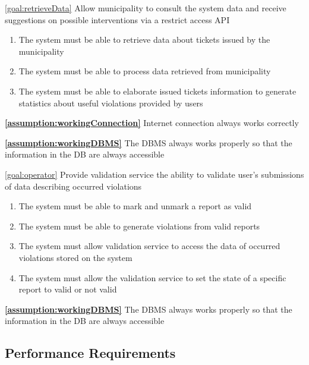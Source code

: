 \begin{description}
   		\item \ref{goal:retrieveData} Allow municipality to consult the system data and receive suggestions on possible interventions via a restrict access API 
   				\begin{enumerate}[resume*] 
  				\item The system must be able to retrieve data about tickets issued by the municipality 
   				\item The system must be able to process data retrieved from municipality
   				\item The system must be able to elaborate issued tickets information to generate statistics about useful violations provided by users
   			\end{enumerate}
   			
   			\textbf{\ref{assumption:workingConnection}} Internet connection always works correctly
   			
			\textbf{\ref{assumption:workingDBMS}} The DBMS always works properly so that the information in the DB are always accessible

		\item \ref{goal:operator} Provide validation service the ability to validate user's submissions of data describing occurred violations
			   \begin{enumerate}[resume*]
				   \item The system must be able to mark and unmark a report as valid
				   \item The system must be able to generate violations from valid reports
				   \item The system must allow validation service to access the data of occurred violations stored on the system
				   \item The system must allow the validation service to set the state of a speciﬁc report to valid or not valid
			   \end{enumerate}

			   \textbf{\ref{assumption:workingDBMS}} The DBMS always works properly so that the information in the DB are always accessible



   	\end{description}
   	
\clearpage 

\subsection{Performance Requirements}

